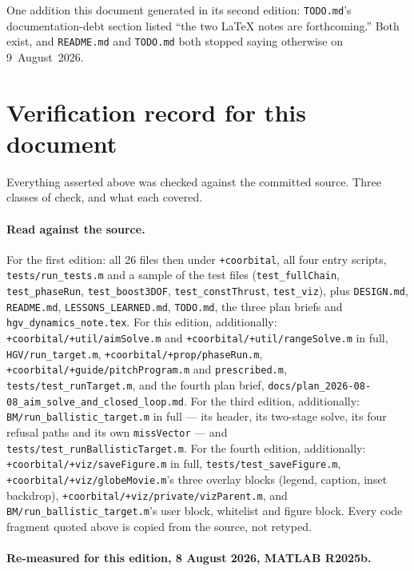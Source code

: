 \documentclass[11pt]{article}
\newcommand{\code}[1]{\texttt{#1}}
\begin{document}
One addition this document generated in its second edition: \code{TODO.md}'s
documentation-debt section listed ``the two \LaTeX{} notes are forthcoming.''
Both exist, and \code{README.md} and \code{TODO.md} both stopped saying
otherwise on 9~August~2026.

\section{Verification record for this document}
\label{sec:verify}

Everything asserted above was checked against the committed source. Three
classes of check, and what each covered.

\paragraph{Read against the source.} For the first edition: all 26 files then
under \code{+coorbital}, all four entry scripts, \code{tests/run\_tests.m} and
a sample of the test files (\code{test\_fullChain}, \code{test\_phaseRun},
\code{test\_boost3DOF}, \code{test\_constThrust}, \code{test\_viz}), plus
\code{DESIGN.md}, \code{README.md}, \code{LESSONS\_LEARNED.md},
\code{TODO.md}, the three plan briefs and \code{hgv\_dynamics\_note.tex}. For
this edition, additionally: \code{+coorbital/+util/aimSolve.m} and
\code{+coorbital/+util/rangeSolve.m} in full, \code{HGV/run\_target.m},
\code{+coorbital/+prop/phaseRun.m}, \code{+coorbital/+guide/pitchProgram.m}
and \code{prescribed.m}, \code{tests/test\_runTarget.m}, and the fourth plan
brief, \code{docs/plan\_2026-08-08\_aim\_solve\_and\_closed\_loop.md}. For the
third edition, additionally: \code{BM/run\_ballistic\_target.m} in full ---
its header, its two-stage solve, its four refusal paths and its own
\code{missVector} --- and \code{tests/test\_runBallisticTarget.m}. For the
fourth edition, additionally: \code{+coorbital/+viz/saveFigure.m} in full,
\code{tests/test\_saveFigure.m}, \code{+coorbital/+viz/globeMovie.m}'s three
overlay blocks (legend, caption, inset backdrop),
\code{+coorbital/+viz/private/vizParent.m}, and
\code{BM/run\_ballistic\_target.m}'s user block, whitelist and figure block.
Every code fragment quoted above is copied from the source, not retyped.

\paragraph{Re-measured for this edition, 8 August 2026, MATLAB R2025b.}
\end{document}
